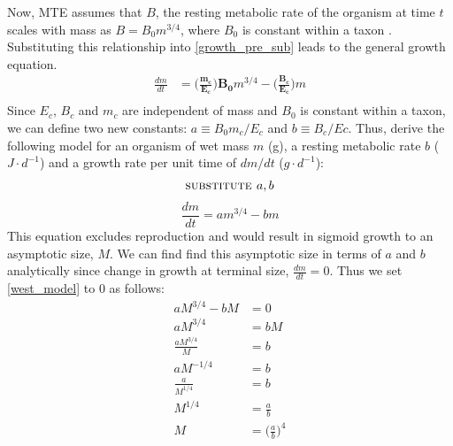 \documentclass[a4paper]{article} %
\begin{document}
Now, MTE assumes that $B$, the resting metabolic rate of the organism at time $t$ scales with mass as $B = B_{0}m^{3/4}$, where $B_0$ is constant within a taxon \autocite{West1997,brown2000-scaling-book, Brown2004}. Substituting this relationship into \cref{growth_pre_sub} leads to the general growth equation.
\begin{align*}
    \frac{dm}{dt} &= \bm{\Bigg(\frac{m_c}{E_c}\Bigg)B_{0}}m^{3/4} - \bm{\Bigg(\frac{B_{c}}{E_c}\Bigg)}m \\
\end{align*}
Since $E_c$, $B_c$ and $m_c$ are independent of mass and $B_0$ is constant within a taxon, we can define two new constants: $a \equiv B_{0}m_{c}/E_{c}$ and $b \equiv B_{c}/E{c}$. Thus, \textcite{West2001} derive the following model for an organism of wet mass $m$ (g), a resting metabolic rate $b$ ($J \cdot d^{-1}$) and a growth rate per unit time of $dm/dt$ ($g \cdot d^{-1}$):
\begin{align*}
    \textsc{substitute }a, b
\end{align*}
\begin{equation}
    \frac{dm}{dt} = am^{3/4} - bm \label{west_model}
\end{equation}
This equation excludes reproduction and would result in sigmoid growth to an asymptotic size, $M$. We can find find this asymptotic size in terms of $a$ and $b$ analytically since change in growth at terminal size, $\frac{dm}{dt} = 0$. Thus we set \cref{west_model} to 0 as follows:
\begin{align*}
    aM^{3/4} - bM &= 0 \\
    aM^{3/4} &= bM \\
    \frac{aM^{3/4}}{M} &= b \\
    aM^{-1/4} &= b \\
    \frac{a}{M^{1/4}} &= b \\
    M^{1/4} &= \frac{a}{b} \\
    M &= \Big(\frac{a}{b}\Big)^4
\end{align*}
\end{document}
